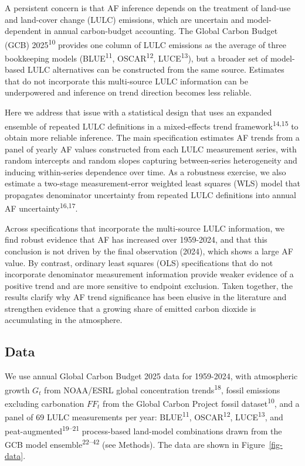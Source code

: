 \documentclass[
  12pt,
  letterpaper,
  DIV=11,
  numbers=noendperiod]{scrartcl}
\begin{document}
A persistent concern is that AF inference depends on the treatment of
land-use and land-cover change (LULC) emissions, which are uncertain and
model-dependent in annual carbon-budget accounting. The Global Carbon
Budget (GCB) 2025\textsuperscript{10} provides one column of LULC
emissions as the average of three bookkeeping models
(BLUE\textsuperscript{11}, OSCAR\textsuperscript{12},
LUCE\textsuperscript{13}), but a broader set of model-based LULC
alternatives can be constructed from the same source. Estimates that do
not incorporate this multi-source LULC information can be underpowered
and inference on trend direction becomes less reliable.

Here we address that issue with a statistical design that uses an
expanded ensemble of repeated LULC definitions in a mixed-effects trend
framework\textsuperscript{14,15} to obtain more reliable inference. The
main specification estimates AF trends from a panel of yearly AF values
constructed from each LULC measurement series, with random intercepts
and random slopes capturing between-series heterogeneity and inducing
within-series dependence over time. As a robustness exercise, we also
estimate a two-stage measurement-error weighted least squares (WLS)
model that propagates denominator uncertainty from repeated LULC
definitions into annual AF uncertainty\textsuperscript{16,17}.

Across specifications that incorporate the multi-source LULC
information, we find robust evidence that AF has increased over
1959-2024, and that this conclusion is not driven by the final
observation (2024), which shows a large AF value. By contrast, ordinary
least squares (OLS) specifications that do not incorporate denominator
measurement information provide weaker evidence of a positive trend and
are more sensitive to endpoint exclusion. Taken together, the results
clarify why AF trend significance has been elusive in the literature and
strengthen evidence that a growing share of emitted carbon dioxide is
accumulating in the atmosphere.

\subsection*{Data}\label{data}

We use annual Global Carbon Budget 2025 data for 1959-2024, with
atmospheric growth \(G_t\) from NOAA/ESRL global concentration
trends\textsuperscript{18}, fossil emissions excluding carbonation
\(FF_t\) from the Global Carbon Project fossil
dataset\textsuperscript{10}, and a panel of 69 LULC measurements per
year: BLUE\textsuperscript{11}, OSCAR\textsuperscript{12},
LUCE\textsuperscript{13}, and peat-augmented\textsuperscript{19--21}
process-based land-model combinations drawn from the GCB model
ensemble\textsuperscript{22--42} (see Methods). The data are shown in
Figure~\ref{fig-data}.
\end{document}
